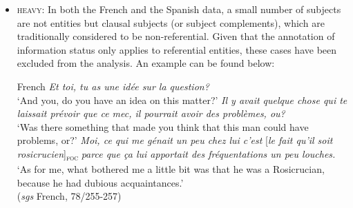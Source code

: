 \begin{itemize}
\ea \label{ex:5:7} Spanish
\ea \textit{Y, volviendo a las amistades mm del señor,} \textit{¿Eran?}\\
 `And, coming back to the acquaintances of the man, who were they?'
  \textit{	¿Frecuentaban mucho por aquí estas amistades que usted dice que tenía?}\\
 `Did they use to come over here, these acquaintances that you say that he had?'
\ex  \textit{Bueno, normalmente cambiaban.}\\    
`Well, they change continuously.'
  \textit{Pero en los últimos meses habían venido mucho} {[\textit{dos personas}]\textsubscript{\textsc{foc.}}}\normalsize\\
`But, lately, two people came more often.' \\
\hfill (\textit{sgs} Spanish, 2/277-280)        
\z \z

\ea \label{ex:5:8} French
\ea \textit{Il y a d'autres voisins qui sont rentrés ou sortis avant?}\\
 ‘Are there other people who entered or left the building before this moment?'
\ex \textit{Oui}.\\    
‘Yes.'
 \textit{Dites-moi qui, s'il-vous-plaît!}\\    
‘Tell me who, please!'
  \textit{Non, posez les questions.}\\    
‘No, ask me specific questions.'
 \textit{Donc, en fait, il y a}  {[\textit{une femme qui habite au dessus}]\textsubscript{\textsc{foc}}} \normalsize \textit{qui est rentrée aussi}.\\
`So, actually, there is a woman who lives upstairs who came back as well.' \\ 
\hfill (\textit{sgs} French, 10/332-336)     
\z \z 

\item \textsc{heavy}: In both the French and the Spanish data, a small number of subjects are not entities but clausal subjects (or subject complements), which are traditionally considered to be non-referential. Given that the annotation of information status only applies to referential entities, these cases have been excluded from the analysis. An example can be found below:

\ea \label{ex:5:9} French
\ea \textit{Et toi, tu as une idée sur la question?}\\
 `And you, do you have an idea on this matter?'
  \textit{Il y avait quelque chose qui te laissait prévoir que ce mec, il pourrait avoir des problèmes, ou?} \\    
`Was there something that made you think that this man could have problems, or?'
\ex \textit{Moi, ce qui me génait un peu chez lui c'est} {[\textit{le fait qu'il soit rosicrucien}]\textsubscript{\textsc{foc}}} \normalsize \textit{parce que ça lui apportait des fréquentations un peu louches.}\\
`As for me, what bothered me a little bit was that he was a Rosicrucian, because he had dubious acquaintances.'\\ \hfill (\textit{sgs} French, 78/255-257)   
\z \z 
\end{itemize}



